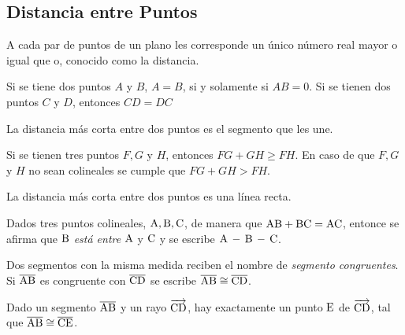 \clearpage

\subsection{Distancia entre Puntos}

\begin{postulate}
A cada par de puntos de un plano les corresponde un único número real mayor o igual que o, conocido como la distancia.
\end{postulate}

\begin{postulate}
Si se tiene dos puntos $A$ y $B$, $A = B$, si y solamente si $AB = 0$.
Si se tienen dos puntos $C$ y $D$, entonces $CD = DC$
\end{postulate}

\begin{postulate}
La distancia más corta entre dos puntos es el segmento que les une.
\end{postulate}

\begin{theorem}
    Si se tienen tres puntos $F,G$ y $H$, entonces $FG + GH \ge FH$. En caso de que $F,G$ y $H$ no sean colineales se cumple que $FG + GH > FH$.

    \begin{corolary}
    La distancia más corta entre dos puntos es una línea recta.
    \end{corolary}
    
\end{theorem}

\begin{definition}
    Dados tres puntos colineales, $\rm A,B,C$, de manera que $\rm AB + \rm BC = \rm AC$, entonce se afirma que $\rm B$ \textit{está entre} $\rm A$ y $\rm C$ y se escribe $\rm A \,- \,B \,- \, C$.
\end{definition}

\begin{definition}
    Dos segmentos con la misma medida reciben el nombre de \textit{segmento congruentes}. Si $\overline{\rm AB}$ es congruente con $\overline{\rm CD}$ se escribe $\overline{\rm AB} \cong \overline{\rm CD}$.
\end{definition}

\begin{theorem}
    Dado un segmento $\overline{\rm AB}$ y un rayo $\overrightarrow{\rm CD}$, hay exactamente un punto $\rm E$ de $\overrightarrow{\rm CD}$, tal que $\overline{\rm AB} \cong \overline{\rm CE}$.   

\end{theorem}

